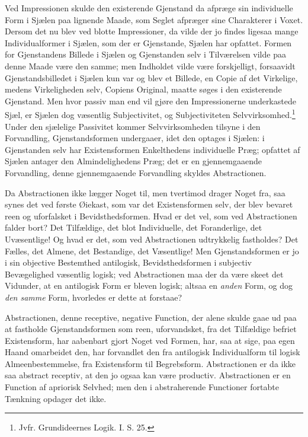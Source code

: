 \documentclass[12pt]{book}
\newcommand{\opage}[1]{\marginnote{\footnotesize\textit{[#1]}}}
\begin{document}
Ved Impressionen skulde den existerende Gjenstand da
afpræge sin individuelle Form i Sjælen paa lignende Maade,
som Seglet afpræger sine Charakterer i Voxet. Dersom
det nu blev ved blotte Impressioner, da vilde der jo findes
ligesaa mange Individualformer i Sjælen, som der er Gjenstande,
Sjælen har opfattet. Formen for Gjenstandens
Billede i Sjælen og Gjenstanden selv i Tilværelsen vilde paa
denne Maade være den samme; men Indholdet vilde være
forskjelligt, forsaavidt Gjenstandsbilledet i Sjælen kun var og
blev et Billede, en Copie af det Virkelige, medens Virkeligheden
selv, Copiens Original, maatte søges i den existerende
Gjenstand. Men hvor passiv man end vil gjøre den Impressionerne
underkastede Sjæl, er Sjælen dog væsentlig
\opage{109}Subjectivitet, og Subjectiviteten Selvvirksomhed.\footnote{Jvfr. Grundideernes Logik. I. S. 25.} %
Under den
sjælelige Passivitet kommer Selvvirksomheden tilsyne i den
Forvandling, Gjenstandsformen undergaaer, idet den optages
i Sjælen: i Gjenstanden selv har Existensformen Enkelthedens
individuelle Præg; opfattet af Sjælen antager den
Almindelighedens Præg; det er en gjennemgaaende Forvandling,
denne gjennemgaaende Forvandling skyldes Abstractionen.

Da Abstractionen ikke lægger Noget til, men tvertimod
drager Noget fra, saa synes det ved første Øiekast, som var
det Existensformen selv, der blev bevaret reen og uforfalsket i
Bevidsthedsformen. Hvad er det vel, som ved Abstractionen
falder bort? Det Tilfældige, det blot Individuelle, det Foranderlige,
det Uvæsentlige! Og hvad er det, som ved Abstractionen
udtrykkelig fastholdes? Det Fælles, det Almene,
det Bestandige, det Væsentlige! Men Gjenstandsformen er jo
i sin objective Bestemthed antilogisk, Bevidsthedsformen i
subjectiv Bevægelighed væsentlig logisk; ved Abstractionen maa
der da være skeet det Vidunder, at en antilogisk Form er
bleven logisk; altsaa en \emph{anden} Form, og dog \emph{den samme}
Form, hvorledes er dette at forstaae?

Abstractionen, denne receptive, negative Function, der
alene skulde gaae ud paa at fastholde Gjenstandsformen som
reen, uforvandsket, fra det Tilfældige befriet Existensform,
har aabenbart gjort Noget ved Formen, har, saa at sige, paa
egen Haand omarbeidet den, har forvandlet den fra antilogisk
Individualform til logisk Almeenbestemmelse, fra Existensform
til Begrebsform. Abstractionen er da ikke saa abstract receptiv,
at den jo ogsaa kan være productiv. Abstractionen er
en Function af apriorisk Selvhed; men den i abstraherende
Functioner fortabte Tænkning opdager det ikke.
\end{document}
